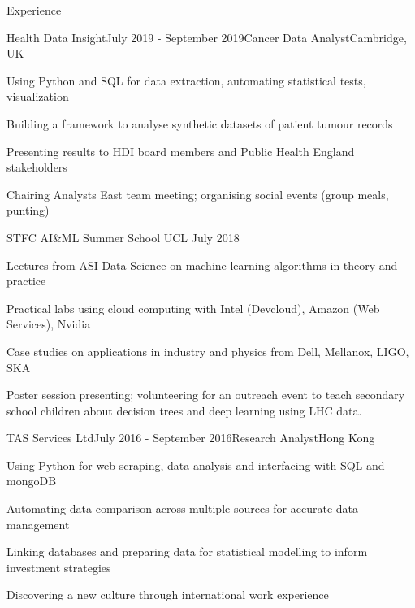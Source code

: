 \documentclass{resume} %
\begin{document}
\begin{rSection}{Experience}

\begin{rSubsection}{Health Data Insight}{July 2019 - September 2019}{Cancer Data Analyst}{Cambridge, UK}
\item Using Python and SQL for data extraction, automating statistical tests, visualization
\item Building a framework to analyse synthetic datasets of patient tumour records
\item Presenting results to HDI board members and Public Health England stakeholders
\item Chairing Analysts East team meeting; organising social events (group meals, punting)
\end{rSubsection}


\begin{rSubsection}{STFC AI\&ML Summer School UCL
}{July 2018}{}{}
\item Lectures from ASI Data Science on machine learning algorithms in theory and practice
\item Practical labs using cloud computing with Intel (Devcloud), Amazon (Web Services), Nvidia
\item Case studies on applications in industry and physics from Dell, Mellanox, LIGO, SKA
\item Poster session presenting; volunteering for an outreach event to teach secondary school children about decision trees and deep learning using LHC data.
\end{rSubsection}


\begin{rSubsection}{TAS Services Ltd}{July 2016 - September 2016}{Research Analyst}{Hong Kong}
\item Using Python for web scraping, data analysis and interfacing with SQL and mongoDB
\item Automating data comparison across multiple sources for accurate data management
\item Linking databases and preparing data for statistical modelling to inform investment strategies
\item Discovering a new culture through international work experience
\end{rSubsection}



\end{rSection}
\end{document}

